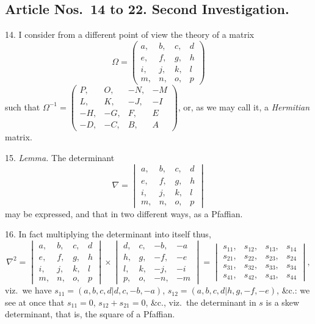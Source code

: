 \documentclass[11pt,a4paper]{article}
\theoremstyle{plain}
\begin{document}
\subsection*{Article Nos.~14 to 22. Second Investigation.}

14. I consider from a different point of view the theory of a matrix
\[
\Omega =
\begin{pmatrix}
a, & b, & c, & d \\
e, & f, & g, & h \\
i, & j, & k, & l \\
m, & n, & o, & p
\end{pmatrix}
\]
such that $\Omega^{-1} =
\begin{pmatrix}
P, & O, & -N, & -M \\
L, & K, & -J, & -I \\
-H, & -G, & F, & E \\
-D, & -C, & B, & A
\end{pmatrix}$,
or, as we may call it, a \textit{Hermitian} matrix.

15. \textit{Lemma.} The determinant
\[
\nabla =
\begin{vmatrix}
a, & b, & c, & d \\
e, & f, & g, & h \\
i, & j, & k, & l \\
m, & n, & o, & p
\end{vmatrix}
\]
may be expressed, and that in two different ways, as a Pfaffian.

16. In fact multiplying the determinant into itself thus,
\[
\nabla^2 =
\begin{vmatrix}
a, & b, & c, & d \\
e, & f, & g, & h \\
i, & j, & k, & l \\
m, & n, & o, & p
\end{vmatrix}
\times
\begin{vmatrix}
d, & c, & -b, & -a \\
h, & g, & -f, & -e \\
l, & k, & -j, & -i \\
p, & o, & -n, & -m
\end{vmatrix}
=
\begin{vmatrix}
s_{11}, & s_{12}, & s_{13}, & s_{14} \\
s_{21}, & s_{22}, & s_{23}, & s_{24} \\
s_{31}, & s_{32}, & s_{33}, & s_{34} \\
s_{41}, & s_{42}, & s_{43}, & s_{44}
\end{vmatrix},
\]
viz.\ we have $s_{11} = (a,b,c,d  |  d,c,-b,-a)$, $s_{12} = (a,b,c,d  |  h,g,-f,-e)$, \&c.: we see at once that $s_{11} = 0$, $s_{12} + s_{21} = 0$, \&c., viz.\ the determinant in $s$ is a skew determinant, that is, the square of a Pfaffian.
\end{document}
